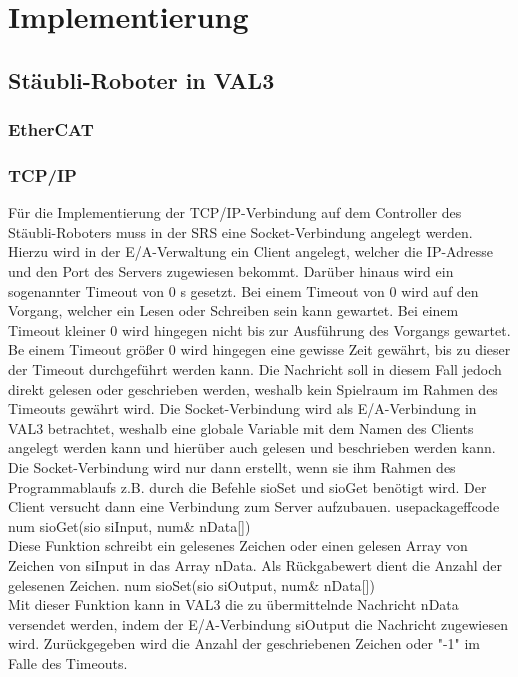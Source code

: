 \documentclass[ a4paper,
                oneside,
                toc=bibliography,
                toc=listof
                ]{scrbook}
\begin{document}
	\newpage
	\chapter{Implementierung}
	
	\section{Stäubli-Roboter in VAL3}
	
	\subsection{EtherCAT}
	
	\subsection{TCP/IP}
	Für die Implementierung der TCP/IP-Verbindung auf dem Controller des Stäubli-Roboters muss in der SRS eine Socket-Verbindung angelegt werden. Hierzu wird in der E/A-Verwaltung ein Client angelegt, welcher die IP-Adresse und den Port des Servers zugewiesen bekommt. Darüber hinaus wird ein sogenannter Timeout von 0 s gesetzt. Bei einem Timeout von 0 wird auf den Vorgang, welcher ein Lesen oder Schreiben sein kann gewartet. Bei einem Timeout kleiner 0 wird hingegen nicht bis zur Ausführung des Vorgangs gewartet. Be einem Timeout größer 0 wird hingegen eine gewisse Zeit gewährt, bis zu dieser der Timeout durchgeführt werden kann. Die Nachricht soll in diesem Fall jedoch direkt gelesen oder geschrieben werden, weshalb kein Spielraum im Rahmen des Timeouts gewährt wird. \cite{VAL3} Die Socket-Verbindung wird als E/A-Verbindung in VAL3 betrachtet, weshalb eine globale Variable mit dem Namen des Clients angelegt werden kann und hierüber auch gelesen und beschrieben werden kann. Die Socket-Verbindung wird nur dann erstellt, wenn sie ihm Rahmen des Programmablaufs z.B. durch die Befehle sioSet und sioGet benötigt wird. Der Client versucht dann eine Verbindung zum Server aufzubauen.   usepackage{ffcode}\\
	num sioGet(sio siInput, num\& nData[])\\
	Diese Funktion schreibt ein gelesenes Zeichen oder einen gelesen Array von Zeichen von siInput in das Array nData. Als Rückgabewert dient die Anzahl der gelesenen Zeichen.	
	num sioSet(sio siOutput, num\& nData[]) \\
	Mit dieser Funktion kann in VAL3 die zu übermittelnde Nachricht nData versendet werden, indem der E/A-Verbindung siOutput die Nachricht zugewiesen wird. Zurückgegeben wird die Anzahl der geschriebenen Zeichen oder "-1" im Falle des Timeouts. \\
\end{document}
